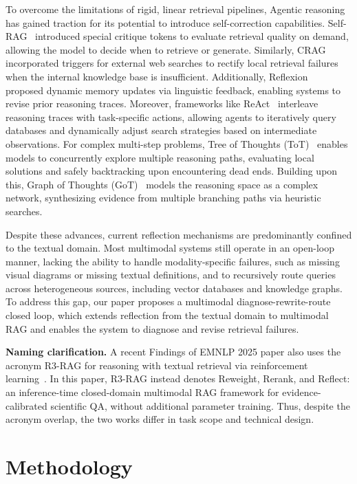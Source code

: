 \documentclass[a4paper, fleqn]{cas-dc}
\begin{document}
To overcome the limitations of rigid, linear retrieval pipelines, Agentic reasoning has gained traction for its potential to introduce self-correction capabilities.
Self-RAG~\cite{Asai2024} introduced special critique tokens to evaluate retrieval quality on demand, allowing the model to decide when to retrieve or generate.
Similarly, CRAG~\cite{Yan2024} incorporated triggers for external web searches to rectify local retrieval failures when the internal knowledge base is insufficient.
Additionally, Reflexion~\cite{Shinn2023} proposed dynamic memory updates via linguistic feedback, enabling systems to revise prior reasoning traces.
Moreover, frameworks like ReAct~\cite{Yao2023} interleave reasoning traces with task-specific actions, allowing agents to iteratively query databases and dynamically adjust search strategies based on intermediate observations.
For complex multi-step problems, Tree of Thoughts (ToT)~\cite{Yao2023ToT} enables models to concurrently explore multiple reasoning paths, evaluating local solutions and safely backtracking upon encountering dead ends.
Building upon this, Graph of Thoughts (GoT)~\cite{Besta2024} models the reasoning space as a complex network, synthesizing evidence from multiple branching paths via heuristic searches.

Despite these advances, current reflection mechanisms are predominantly confined to the textual domain.
Most multimodal systems still operate in an open-loop manner, lacking the ability to handle modality-specific failures, such as missing visual diagrams or missing textual definitions, and to recursively route queries across heterogeneous sources, including vector databases and knowledge graphs.
To address this gap, our paper proposes a multimodal diagnose-rewrite-route closed loop, which extends reflection from the textual domain to multimodal RAG and enables the system to diagnose and revise retrieval failures.

\textbf{Naming clarification.} A recent Findings of EMNLP 2025 paper also uses the acronym R3-RAG for reasoning with textual retrieval via reinforcement learning~\cite{li2025r3rag}. In this paper, R3-RAG instead denotes Reweight, Rerank, and Reflect: an inference-time closed-domain multimodal RAG framework for evidence-calibrated scientific QA, without additional parameter training. Thus, despite the acronym overlap, the two works differ in task scope and technical design.

\section{Methodology}\label{sec:methodology}
\end{document}
